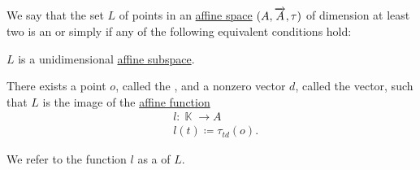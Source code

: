 \begin{definition}\label{def:affine_line}\mimprovised
  We say that the set \( L \) of points in an \hyperref[def:affine_space]{affine space} \( (A, \overrightarrow{A}, \tau) \) of dimension at least two is an  or simply  if any of the following equivalent conditions hold:

  \begin{thmenum}
     \( L \) is a unidimensional \hyperref[def:affine_subspace]{affine subspace}.

     There exists a point \( o \), called the , and a nonzero vector \( d \), called the  vector, such that \( L \) is the image of the \hyperref[def:affine_operator]{affine function}
    \begin{equation}\label{eq:def:affine_line/parametric}
      \begin{aligned}
        &l: \BbbK \to A \\
        &l(t) \coloneqq \tau_{t d}(o).
      \end{aligned}
    \end{equation}

    We refer to the function \( l \) as a  of \( L \).
  \end{thmenum}
\end{definition}
